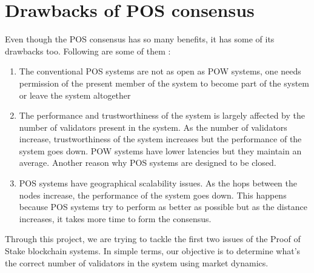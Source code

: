 \section{Drawbacks of POS consensus}

Even though the POS consensus has so many benefits, it has some of its drawbacks too. Following are some of them :

\begin{enumerate}
    \item The conventional POS systems are not as open as POW systems, one needs permission of the present member of the system to become part of the system or leave the system altogether
    \item The performance and trustworthiness of the system is largely affected by the number of validators present in the system. As the number of validators increase, trustworthiness of the system increases but the performance of the system goes down. POW systems have lower latencies but they maintain an average. Another reason why POS systems are designed to be closed.
    \item POS systems have geographical scalability issues. As the hops between the nodes increase, the performance of the system goes down. This happens because POS systems try to perform as better as possible but as the distance increases, it takes more time to form the consensus.
\end{enumerate}
Through this project, we are trying to tackle the first two issues of the Proof of Stake blockchain systems. In simple terms, our objective is to determine what's the correct number of validators in the system using market dynamics.



